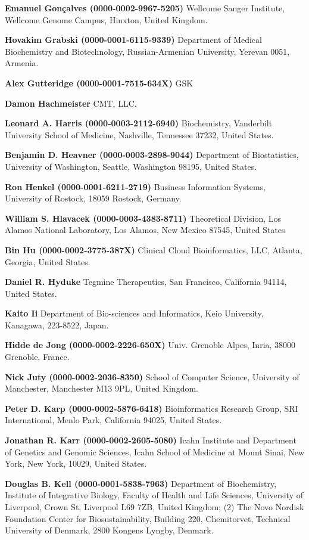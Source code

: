 \documentclass{sbml-paper}
\begin{document}
\textbf{Emanuel Gonçalves (0000-0002-9967-5205)} Wellcome Sanger Institute, Wellcome Genome Campus, Hinxton, United Kingdom.

\textbf{Hovakim Grabski (0000-0001-6115-9339)} Department of Medical Biochemistry and Biotechnology, Russian-Armenian University, Yerevan 0051, Armenia.

\textbf{Alex Gutteridge (0000-0001-7515-634X)} GSK

\textbf{Damon Hachmeister} CMT, LLC.

\textbf{Leonard A. Harris (0000-0003-2112-6940)} Biochemistry, Vanderbilt University School of Medicine, Nashville, Tennessee 37232, United States.

\textbf{Benjamin D. Heavner (0000-0003-2898-9044)} Department of Biostatistics, University of Washington, Seattle, Washington 98195, United States.

\textbf{Ron Henkel (0000-0001-6211-2719)} Business Information Systems, University of Rostock, 18059 Rostock, Germany.

\textbf{William S. Hlavacek (0000-0003-4383-8711)} Theoretical Division, Los Alamos National Laboratory, Los Alamos, New Mexico 87545, United States

\textbf{Bin Hu (0000-0002-3775-387X)} Clinical Cloud Bioinformatics, LLC, Atlanta, Georgia, United States.

\textbf{Daniel R. Hyduke} Tegmine Therapeutics, San Francisco, California 94114, United States.

\textbf{Kaito Ii} Department of Bio-sciences and Informatics, Keio University, Kanagawa, 223-8522, Japan.

\textbf{Hidde de Jong (0000-0002-2226-650X)} Univ. Grenoble Alpes, Inria, 38000 Grenoble, France.

\textbf{Nick Juty (0000-0002-2036-8350)} School of Computer Science, University of Manchester, Manchester M13 9PL, United Kingdom.

\textbf{Peter D. Karp (0000-0002-5876-6418)} Bioinformatics Research Group, SRI International, Menlo Park, California 94025, United States.

\textbf{Jonathan R. Karr (0000-0002-2605-5080)} Icahn Institute and Department of Genetics and Genomic Sciences, Icahn School of Medicine at Mount Sinai, New York, New York, 10029, United States.

\textbf{Douglas B. Kell (0000-0001-5838-7963)} Department of Biochemistry, Institute of Integrative Biology, Faculty of Health and Life Sciences, University of Liverpool, Crown St, Liverpool L69 7ZB, United Kingdom; (2) The Novo Nordisk Foundation Center for Biosustainability, Building 220, Chemitorvet, Technical University of Denmark, 2800 Kongens Lyngby, Denmark.
\end{document}
